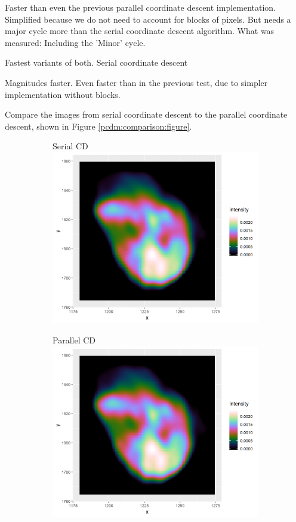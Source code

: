 Faster than even the previous parallel coordinate descent implementation. Simplified because we do not need to account for blocks of pixels.
But needs a major cycle more than the serial coordinate descent algorithm.
What was measured: Including the 'Minor' cycle.
		
Fastest variants of both. Serial coordinate descent


Magnitudes faster. Even faster than in the previous test, due to simpler implementation without blocks.

Compare the images from serial coordinate descent to the parallel coordinate descent, shown in Figure \ref{pcdm:comparison:figure}.
\begin{figure}[h]
	\centering
	\begin{subfigure}{0.4\linewidth}
		\centering
		Serial CD
		\includegraphics[width=1.0\linewidth]{./chapters/05.pcdm/comparison/SerialCD-N132.png}
	\end{subfigure}
	\begin{subfigure}{0.4\linewidth}
		\centering
		Parallel CD
		\includegraphics[width=1.0\linewidth]{./chapters/05.pcdm/comparison/SerialCD-N132.png}

\end{subfigure}
\end{figure}
